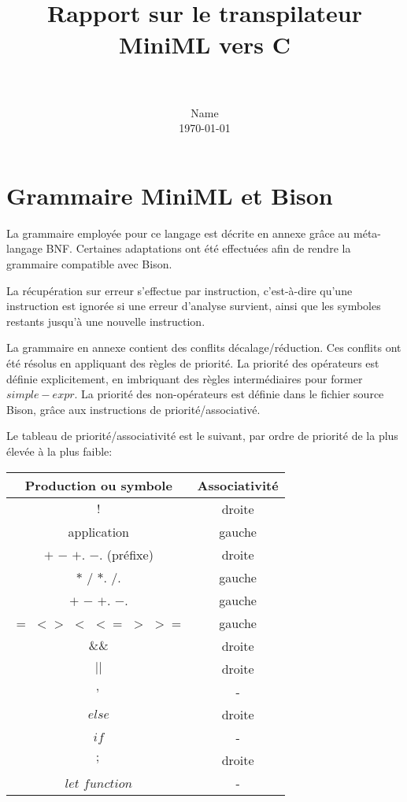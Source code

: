 \documentclass[paper=a4, fontsize=11pt]{scrartcl}
\title{
		\vspace{-1in} 	
		\usefont{OT1}{bch}{b}{n}
		\horrule{0.5pt} \\[0.4cm]
		\huge Rapport sur le transpilateur MiniML vers C \\
		\horrule{2pt} \\[0.5cm]
}
\author{
		\normalfont 								\normalsize
        Name \\[-3pt]		\normalsize
        \today
}
\date{}
\numberwithin{equation}{section}		%
\numberwithin{figure}{section}			%
\numberwithin{table}{section}				%
\begin{document}
\maketitle

\tableofcontents
\newpage

\section{Grammaire MiniML et Bison}

La grammaire employée pour ce langage est décrite en annexe grâce au méta-langage BNF.
Certaines adaptations ont été effectuées afin de rendre la grammaire compatible avec Bison.

La récupération sur erreur s'effectue par instruction, c'est-à-dire qu'une instruction est ignorée si une erreur d'analyse survient, ainsi que les symboles restants jusqu'à une nouvelle instruction.

La grammaire en annexe contient des conflits décalage/réduction.
Ces conflits ont été résolus en appliquant des règles de priorité.
La priorité des opérateurs est définie explicitement, en imbriquant des règles intermédiaires pour former $simple-expr$.
La priorité des non-opérateurs est définie dans le fichier source Bison, grâce aux instructions de priorité/associativé.

Le tableau de priorité/associativité est le suivant, par ordre de priorité de la plus élevée à la plus faible:

\begin{center}
\begin{tabular}{ | c | c | }
\hline
Production ou symbole & Associativité \\ \hline
$!$ 							& droite \\ 
application						& gauche \\ 
$+$ $-$ $+.$ $-.$ (préfixe)		& droite \\ 
$*$ $/$ $*.$ $/.$ 				& gauche \\ 
$+$ $-$ $+.$ $-.$				& gauche \\ 
$=$ $<>$ $<$ $<=$ $>$ $>=$		& gauche \\ 
$\&\&$							& droite \\ 
$||$							& droite \\ 
$,$								& - \\ 
$else$							& droite \\ 
$if$							& - \\ 
$;$								& droite \\ 
$let$ $function$				& - \\
\hline
\end{tabular}
\end{center}
\end{document}
